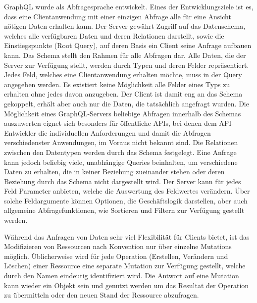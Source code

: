GraphQL wurde als Abfragesprache entwickelt.
Eines der Entwicklungsziele ist es, dass eine Clientanwendung mit einer einzigen Abfrage alle für eine Ansicht nötigen Daten erhalten kann.
Der Server gewährt Zugriff auf das Datenschema, welches alle verfügbaren Daten und deren Relationen darstellt, sowie die Einstiegspunkte (Root Query), auf deren Basis ein Client seine Anfrage aufbauen kann.
Das Schema stellt den Rahmen für alle Abfragen dar.
Alle Daten, die der Server zur Verfügung stellt, werden durch Typen und deren Felder repräsentiert.
Jedes Feld, welches eine Clientanwendung erhalten möchte, muss in der Query angegeben werden.
Es existiert keine Möglichkeit alle Felder eines Typs zu erhalten ohne jedes davon anzugeben.
Der Client ist damit eng an das Schema gekoppelt, erhält aber auch nur die Daten, die tatsächlich angefragt wurden.
Die Möglichkeit eines GraphQL-Servers beliebige Abfragen innerhalb des Schemas auszuwerten eignet sich besonders für öffentliche APIs, bei denen dem API-Entwickler die individuellen Anforderungen und damit die Abfragen verschiedenster Anwendungen, im Voraus nicht bekannt sind.
Die Relationen zwischen den Datentypen werden durch das Schema festgelegt.
Eine Anfrage kann jedoch beliebig viele, unabhängige Queries beinhalten, \zB{} um verschiedene Daten zu erhalten, die in keiner Beziehung zueinander stehen oder deren Beziehung durch das Schema nicht dargestellt wird.
Der Server kann für jedes Feld Parameter anbieten, welche die Auswertung des Feldwertes verändern. Über solche Feldargumente können Optionen, die Geschäftslogik darstellen, aber auch allgemeine Abfragefunktionen, wie \zB{} Sortieren und Filtern zur Verfügung gestellt werden.\par
Während das Anfragen von Daten sehr viel Flexibilität für Clients bietet, ist das Modifizieren von Ressourcen nach Konvention nur über einzelne Mutations möglich.
Üblicherweise wird für jede Operation (Erstellen, Verändern und Löschen) einer Ressource eine separate Mutation zur Verfügung gestellt, welche durch den Namen eindeutig identifiziert wird.
Die Antwort auf eine Mutation kann wieder ein Objekt sein und genutzt werden um das Resultat der Operation zu übermitteln oder den neuen Stand der Ressource abzufragen.
\par

